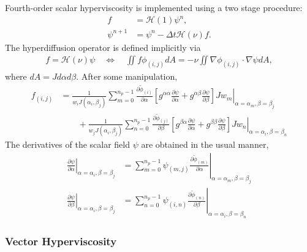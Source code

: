 \documentclass[gmdd, hvmath, online]{copernicus_discussions}
\newcommand{\pdiff}[2]{\frac{\partial #1}{\partial #2}}
\begin{document}
Fourth-order scalar hyperviscosity is implemented using a two stage procedure:
\begin{align}
f &= \mathcal{H}(1) \psi^n, \\
\psi^{n+1} &= \psi^n - \Delta t \mathcal{H}(\nu) f.
\end{align}  The hyperdiffusion operator is defined implicitly via
\begin{align}
f = \mathcal{H}(\nu) \psi \quad \Longleftrightarrow \quad \iint f \phi_{(i,j)} dA = - \nu \iint \nabla \phi_{(i,j)} \cdot \nabla \psi dA,
\end{align} where $dA = J d\alpha d\beta$.  After some manipulation,
\begin{align}
f_{(i,j)} &= \frac{1}{w_i J(\alpha_i, \beta_j)} \sum_{m=0}^{n_p-1} \pdiff{\tilde{\phi}_{(i)}}{\alpha} \left. \left[ g^{\alpha \alpha} \pdiff{\psi}{\alpha} + g^{\alpha \beta} \pdiff{\psi}{\beta} \right] J w_m \right\vert_{\alpha = \alpha_m, \beta = \beta_j} \nonumber \\
& \qquad + \frac{1}{w_j J(\alpha_i, \beta_j)} \sum_{n=0}^{n_p-1} \pdiff{\tilde{\phi}_{(j)}}{\beta} \left. \left[ g^{\beta \alpha} \pdiff{\psi}{\alpha} + g^{\beta \beta} \pdiff{\psi}{\beta} \right] J w_n \right\vert_{\alpha = \alpha_i, \beta = \beta_n}
\end{align}  The derivatives of the scalar field $\psi$ are obtained in the usual manner,
\begin{align}
\left. \pdiff{\psi}{\alpha} \right\vert_{\alpha = \alpha_i, \beta = \beta_j} &= \sum_{m=0}^{n_p-1} \left. \psi_{(m,j)} \pdiff{\tilde{\phi}_{(m)}}{\alpha} \right\vert_{\alpha = \alpha_m, \beta = \beta_j} \\
\left. \pdiff{\psi}{\beta} \right\vert_{\alpha = \alpha_i, \beta = \beta_j} &= \sum_{n=0}^{n_p-1} \left. \psi_{(i,n)} \pdiff{\tilde{\phi}_{(n)}}{\beta} \right\vert_{\alpha = \alpha_i, \beta = \beta_n}
\end{align}

\subsubsection{Vector Hyperviscosity}
\end{document}
